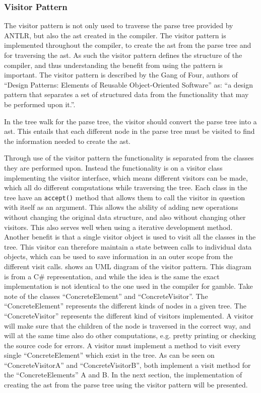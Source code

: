\subsubsection*{Visitor Pattern}\label{subs:visit}
The visitor pattern is not only used to traverse the parse tree provided by ANTLR, but also the \acrshort{ast} created in the compiler.
The visitor pattern is implemented throughout the compiler, to create the \acrshort{ast} from the parse tree and for traversing the \acrshort{ast}.
As such the visitor pattern defines the structure of the compiler, and thus understanding the benefit from using the pattern is important.
The visitor pattern is described by the Gang of Four, authors of ``Design Patterns: Elements of Reusable Object-Oriented Software'' as:
``a design pattern that separates a set of structured data from the functionality that may be performed upon it.''. \citep{GOF}

In the tree walk for the parse tree, the visitor should convert the parse tree into a \acrshort{ast}.
This entails that each different node in the parse tree must be visited to find the information needed to create the \acrshort{ast}.

Through use of the visitor pattern the functionality is separated from the classes they are performed upon. 
Instead the functionality is on a visitor class implementing the visitor interface, which means different visitors can be made, which all do different computations while traversing the tree.
Each class in the tree have an \texttt{accept()} method that allows them to call the visitor in question with itself as an argument.
This allows the ability of adding new operations without changing the original data structure, and also without changing other visitors.
This also serves well when using a iterative development method.
Another benefit is that a single visitor object is used to visit all the classes in the tree.
This visitor can therefore maintain a state between calls to individual data objects, which can be used to save information in an outer scope from the different visit calls.
 shows an UML diagram of the visitor pattern.
This diagram is from a C\# representation, and while the idea is the same the exact implementation is not identical to the one used in the compiler for \gls{gamble}.
Take note of the classes ``ConcreteElement'' and ``ConcreteVisitor''.
The ``ConcreteElement'' represents the different kinds of nodes in a given tree.
The ``ConcreteVisitor'' represents the different kind of visitors implemented.
A visitor will make sure that the children of the node is traversed in the correct way, and will at the same time also do other computations, e.g. pretty printing or checking the source code for errors.
A visitor must implement a method to visit every single ``ConcreteElement'' which exist in the tree.
As can be seen on  ``ConcreteVisitorA'' and ``ConcreteVisitorB'', both implement a visit method for the ``ConcreteElements'' A and B.
In the next section, the implementation of creating the \acrshort{ast} from the parse tree using the visitor pattern will be presented.

